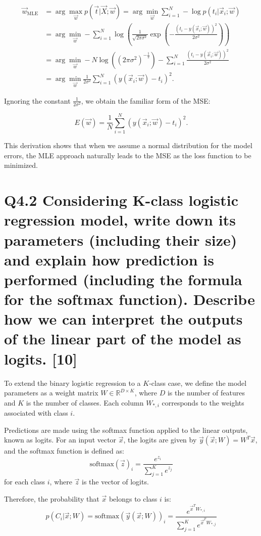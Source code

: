 \documentclass[11pt]{article}
\begin{document}
\[
\begin{aligned}
\vec{w}_{\text{MLE}} &= \arg \max_{\vec{w}} p(\vec{t}|\vec{X}; \vec{w}) = \arg \min_{\vec{w}} \sum_{i=1}^{N} -\log p(t_i|\vec{x}_i; \vec{w}) \\
&= \arg \min_{\vec{w}} -\sum_{i=1}^{N} \log \left(\frac{1}{\sqrt{2\pi\sigma^2}} \exp\left(-\frac{(t_i - y(\vec{x}_i; \vec{w}))^2}{2\sigma^2}\right)\right) \\
&= \arg \min_{\vec{w}} -N \log \left((2\pi\sigma^2)^{-\frac{1}{2}}\right) - \sum_{i=1}^{N} \frac{(t_i - y(\vec{x}_i; \vec{w}))^2}{2\sigma^2} \\
&= \arg \min_{\vec{w}} \frac{1}{2\sigma^2} \sum_{i=1}^{N} (y(\vec{x}_i; \vec{w}) - t_i)^2.
\end{aligned}
\]

Ignoring the constant \( \frac{1}{2\sigma^2} \), we obtain the familiar form of the MSE:

\[
E(\vec{w}) = \frac{1}{N} \sum_{i=1}^{N} (y(\vec{x}_i; \vec{w}) - t_i)^2.
\]

This derivation shows that when we assume a normal distribution for the model errors, the MLE approach naturally leads to the MSE as the loss function to be minimized.


\section{Q4.2 Considering K-class logistic regression model, write down its parameters (including their size) and explain how prediction is performed (including the formula for the softmax function). Describe how we can interpret the outputs of the linear part of the model as logits. [10]}

To extend the binary logistic regression to a \( K \)-class case, we define the model parameters as a weight matrix \( W \in \mathbb{R}^{D \times K} \), where \( D \) is the number of features and \( K \) is the number of classes. Each column \( W_{*,i} \) corresponds to the weights associated with class \( i \).

Predictions are made using the softmax function applied to the linear outputs, known as logits. For an input vector \( \vec{x} \), the logits are given by \( \vec{y}(\vec{x}; W) = W^T\vec{x} \), and the softmax function is defined as:
\[
\text{softmax}(\vec{z})_i = \frac{e^{z_i}}{\sum_{j=1}^{K} e^{z_j}}
\]
for each class \( i \), where \( \vec{z} \) is the vector of logits. 

Therefore, the probability that \( \vec{x} \) belongs to class \( i \) is:
\[
p(C_i | \vec{x}; W) = \text{softmax}(\vec{y}(\vec{x}; W))_i = \frac{e^{\vec{x}^TW_{*,i}}}{\sum_{j=1}^{K} e^{\vec{x}^TW_{*,j}}}
\]
\end{document}
